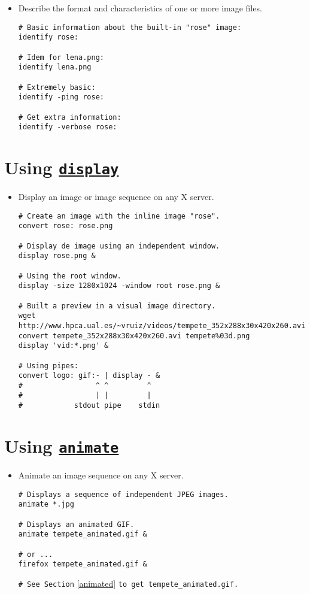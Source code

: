 \begin{itemize}
\item Describe the format and characteristics of one or more image files.
\begin{lstlisting}
# Basic information about the built-in "rose" image:
identify rose:

# Idem for lena.png:
identify lena.png

# Extremely basic:
identify -ping rose:

# Get extra information:
identify -verbose rose:
\end{lstlisting}

\end{itemize}


\section{Using \href{http://www.imagemagick.org/script/display.php}{\texttt{display}}}

\begin{itemize}
\item Display an image or image sequence on any X server.
\begin{lstlisting}
# Create an image with the inline image "rose".
convert rose: rose.png

# Display de image using an independent window.
display rose.png &

# Using the root window.
display -size 1280x1024 -window root rose.png &

# Built a preview in a visual image directory.
wget http://www.hpca.ual.es/~vruiz/videos/tempete_352x288x30x420x260.avi
convert tempete_352x288x30x420x260.avi tempete%03d.png
display 'vid:*.png' &

# Using pipes:
convert logo: gif:- | display - &
#                 ^ ^         ^
#                 | |         |
#            stdout pipe    stdin
\end{lstlisting}

\end{itemize}


\section{Using \href{http://www.imagemagick.org/script/animate.php}{\texttt{animate}}}

\begin{itemize}
\item Animate an image sequence on any X server.
\begin{lstlisting}
# Displays a sequence of independent JPEG images.
animate *.jpg

# Displays an animated GIF.
animate tempete_animated.gif &

# or ...
firefox tempete_animated.gif &
\end{lstlisting}
\verb|# See Section| \ref{animated} \verb|to get tempete_animated.gif.|

\end{itemize}


